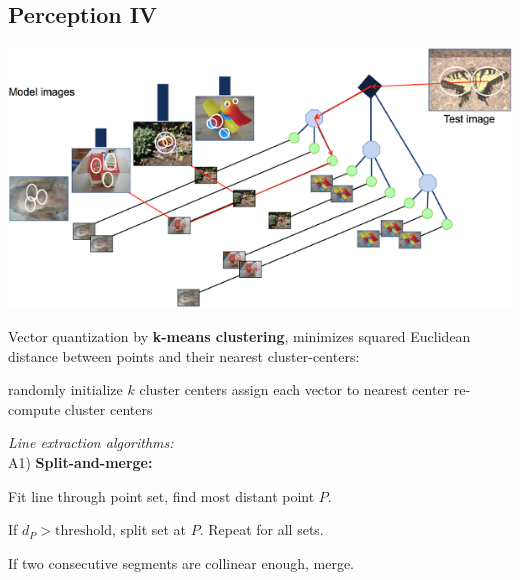 \documentclass[landscape]{article}
\newcommand{\vmspace}{\vspace{-7pt}}
\newcommand{\vamspace}{\vspace{-3pt}}
\begin{document}
\begin{multicols}{3}
\section{Perception IV}

\vmspace

\vspace{-5pt}
\begin{center}
\includegraphics[width=0.85\columnwidth]{img/7_VocabularyTree.png}
\end{center}
\vspace{-10pt}

\begin{minipage}{\columnwidth}
  Vector quantization by \textbf{k-means clustering}, minimizes squared
  Euclidean distance between points and their nearest cluster-centers:

  \vamspace

  \begin{algorithm}[H]
    \DontPrintSemicolon
    randomly initialize $k$ cluster centers\;
    {
      assign each vector to nearest center\;
      re-compute cluster centers\;
    }
  \end{algorithm}
\end{minipage}

\begin{minipage}{\columnwidth}
  \textit{Line extraction algorithms:}\\
  A1) \textbf{Split-and-merge:}
  \begin{compactenum}
  \item Fit line through point set, find most distant point $P$.
  \item If $d_P > \mathrm{threshold}$, split set at $P$. Repeat for all sets.
  \item If two consecutive segments are collinear enough, merge.
  \end{compactenum}
\end{minipage}


\end{multicols}
\end{document}
